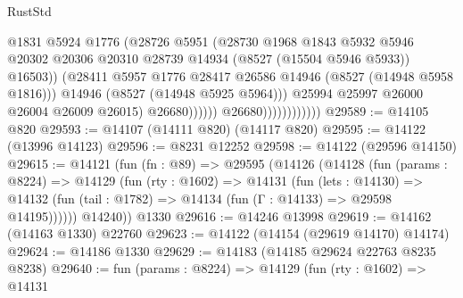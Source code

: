 \begin{lexlean}{RustStd}
\begin{coremodule}
                                            @1831
                                            @5924
                                            @1776
                                            (@28726
                                              @5951
                                              (@28730
                                                @1968
                                                @1843
                                                @5932
                                                @5946
                                                @20302
                                                @20306
                                                @20310
                                                @28739
                                                @14934
                                                (@8527 (@15504 @5946 @5933))
                                                @16503))
                                            (@28411
                                              @5957
                                              @1776
                                              @28417
                                              @26586
                                              @14946
                                              (@8527 (@14948 @5958 @1816)))
                                            @14946
                                            (@8527 (@14948 @5925 @5964)))
                                          @25994
                                          @25997
                                          @26000
                                          @26004
                                          @26009
                                          @26015)
                                        @26680))))))
                            @26680))))))))))))
@29589 := @14105 @820
@29593 := @14107 (@14111 @820) (@14117 @820)
@29595 := @14122 (@13996 @14123)
@29596 := @8231 @12252
@29598 := @14122 (@29596 @14150)
@29615 := @14121
    (fun (fn : @89) =>
    @29595
      (@14126
        (@14128
          (fun (params : @8224) =>
          @14129
            (fun (rty : @1602) =>
            @14131
              (fun (lets : @14130) =>
              @14132 (fun (tail : @1782) => @14134 (fun (Γ : @14133) => @29598 @14195))))))
        @14240))
    @1330
@29616 := @14246 @13998
@29619 := @14162 (@14163 @1330) @22760
@29623 := @14122 (@14154 (@29619 @14170) @14174)
@29624 := @14186 @1330
@29629 := @14183 (@14185 @29624 @22763 @8235 @8238)
@29640 := fun (params : @8224) =>
  @14129
    (fun (rty : @1602) =>
    @14131

\end{coremodule}
\end{lexlean}
